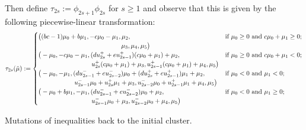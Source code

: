 \documentclass{amsart}
\numberwithin{theorem}{section}
\begin{document}
  Then define $\tau_{2s}:=\phi_{2s+1}\phi_{2s}$ for $s\ge 1$ and observe that this is given by the following piecewise-linear transformation:
  \begin{equation}
    \tau_{2s}(\tilde\mu)
    :=
    \begin{cases} 
      \big((bc-1)\mu_0+b\mu_1,-c\mu_0-\mu_1,\mu_2, & \text{if $\mu_0 \ge 0$ and $c\mu_0+\mu_1 \ge 0$;}\\
      \hspace{1.79in} \mu_3,\mu_4,\mu_5\big) & \\
      \big(-\mu_0,-c\mu_0-\mu_1,(du_{2s}^++eu_{2s-1}^+)(c\mu_0+\mu_1)+\mu_2, & \text{if $\mu_0 \ge 0$ and $c\mu_0+\mu_1 < 0$;}\\
      \hspace{1.15in} u_{2s}^+(c\mu_0+\mu_1)+\mu_3,u_{2s-1}^+(c\mu_0+\mu_1)+\mu_4,\mu_5\big) & \\ 
      \big(-\mu_0,-\mu_1,(du_{2s-1}^-+eu_{2s-2}^-)\mu_0+(du_{2s}^++eu_{2s-1}^+)\mu_1+\mu_2, & \text{if $\mu_0 < 0$ and $\mu_1 < 0$;}\\
      \hspace{0.78in} u_{2s-1}^-\mu_0+u_{2s}^+\mu_1+\mu_3,u_{2s-2}^-\mu_0+u_{2s-1}^+\mu_1+\mu_4,\mu_5\big) & \\ 
      \big(-\mu_0+b\mu_1,-\mu_1,(du_{2s-1}^-+eu_{2s-2}^-)\mu_0+\mu_2, & \text{if $\mu_0 < 0$ and $\mu_1 \ge 0$;}\\
      \hspace{1.15in} u_{2s-1}^-\mu_0+\mu_3,u_{2s-2}^-\mu_0+\mu_4,\mu_5\big) & 
    \end{cases}
  \end{equation}



  Mutations of inequalities back to the initial cluster.
\end{document}
